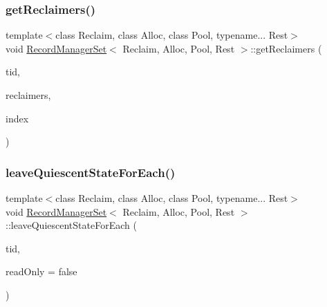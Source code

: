 \mbox{\label{classRecordManagerSet_aa0ba6ecff5652ee607893956d9abfb76}} 
\subsubsection{\texorpdfstring{get\+Reclaimers()}{getReclaimers()}}
{\footnotesize\ttfamily template$<$class Reclaim, class Alloc, class Pool, typename... Rest$>$ \\
void \hyperlink{classRecordManagerSet}{Record\+Manager\+Set}$<$ Reclaim, Alloc, Pool, Rest $>$\+::get\+Reclaimers (\begin{DoxyParamCaption}\item[{const int}]{tid,  }\item[{void $\ast$$\ast$const}]{reclaimers,  }\item[{int}]{index }\end{DoxyParamCaption})\hspace{0.3cm}{\ttfamily [inline]}}

\mbox{\label{classRecordManagerSet_ac26e824b5b47eff1e2f1345b5cd11659}} 
\subsubsection{\texorpdfstring{leave\+Quiescent\+State\+For\+Each()}{leaveQuiescentStateForEach()}}
{\footnotesize\ttfamily template$<$class Reclaim, class Alloc, class Pool, typename... Rest$>$ \\
void \hyperlink{classRecordManagerSet}{Record\+Manager\+Set}$<$ Reclaim, Alloc, Pool, Rest $>$\+::leave\+Quiescent\+State\+For\+Each (\begin{DoxyParamCaption}\item[{const int}]{tid,  }\item[{const bool}]{read\+Only = {\ttfamily false} }\end{DoxyParamCaption})\hspace{0.3cm}{\ttfamily [inline]}}

\mbox{\label{classRecordManagerSet_aaf22c9991972f1e8c288c2b61cbbea51}} 
